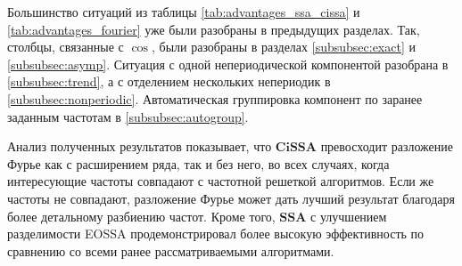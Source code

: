 \documentclass[a4paper, 11pt]{article}
\newcommand{\SSA}{\textbf{SSA}}
\newcommand{\CISSA}{\textbf{CiSSA}}
\begin{document}
Большинство ситуаций из таблицы \ref{tab:advantages_ssa_cissa} и  \ref{tab:advantages_fourier} уже были разобраны в предыдущих разделах. Так, столбцы, связанные с $\cos$, были разобраны в разделах \ref{subsubsec:exact} и \ref{subsubsec:asymp}. Ситуация с одной непериодической компонентой разобрана в \ref{subsubsec:trend}, а с отделением нескольких непериодик в \ref{subsubsec:nonperiodic}. Автоматическая группировка компонент по заранее заданным частотам в \ref{subsubsec:autogroup}.

Анализ полученных результатов показывает, что $\CISSA$ превосходит разложение Фурье как с расширением ряда, так и без него, во всех случаях, когда интересующие частоты совпадают с частотной решеткой алгоритмов. Если же частоты не совпадают, разложение Фурье может дать лучший результат благодаря более детальному разбиению частот. Кроме того, $\SSA$ с улучшением разделимости EOSSA продемонстрировал более высокую эффективность по сравнению со всеми ранее рассматриваемыми алгоритмами.
\end{document}
